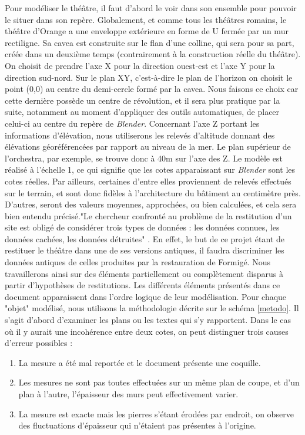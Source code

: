 Pour modéliser le théâtre, il faut d'abord le voir dans son ensemble pour pouvoir le situer dans son repère. Globalement, et comme tous les théâtres romains, le théâtre d'Orange a une enveloppe extérieure en forme de U fermée par un mur rectiligne. Sa \gls{cavea} est construite sur le flan d'une colline, qui sera pour sa part, créée dans un deuxième temps (contrairement à la construction réelle du théâtre). On choisit de prendre l'axe X pour la direction ouest-est et l'axe Y pour la direction sud-nord. Sur le plan XY, c'est-à-dire le plan de l'horizon on choisit le point (0,0) au centre du demi-cercle formé par la \gls{cavea}. Nous faisons ce choix car cette dernière possède un centre de révolution, et il sera plus pratique par la suite, notamment au moment d'appliquer des outils automatiques, de placer celui-ci au centre du repère de \textit{Blender}. Concernant l'axe Z portant les informations d'élévation, nous utiliserons les relevés d'altitude \cite[Pl. XXIX, XLIV, XLVIII, XLIX, LX]{orangePl} donnant des élévations géoréférencées par rapport au niveau de la mer. Le plan supérieur de l'\gls{orchestra}, par exemple, se trouve donc à 40m sur l'axe des Z. Le modèle est réalisé à l'échelle 1, ce qui signifie que les cotes apparaissant sur \textit{Blender} sont les cotes réelles. Par ailleurs, certaines d'entre elles proviennent de relevés effectués sur le terrain, et sont donc fidèles à l'architecture du bâtiment au centimètre près. D'autres, seront des valeurs moyennes, approchées, ou bien calculées, et cela sera bien entendu précisé."Le chercheur confronté au problème de la restitution d’un site est obligé de considérer trois types de données : les données connues, les données cachées, les données détruites" \cite[p. 27]{golvin}. En effet, le but de ce projet étant de restituer le théâtre dans une de ses versions antiques, il faudra discriminer les données antiques de celles produites par la restauration de Formigé. Nous travaillerons ainsi sur des éléments partiellement ou complètement disparus à partir d'hypothèses de restitutions. Les différents éléments présentés dans ce document apparaissent dans l'ordre logique de leur modélisation. Pour chaque "objet" modélisé, nous utilisons la méthodologie décrite sur le schéma \ref{metodo}. Il s'agit d'abord d'examiner les plans ou les textes qui s'y rapportent. Dans le cas où il y aurait une incohérence entre deux cotes, on peut distinguer trois causes d'erreur possibles :
\begin{enumerate}
	\item La mesure a été mal reportée et le document présente une coquille.
	\item Les mesures ne sont pas toutes effectuées sur un même plan de coupe, et d'un plan à l'autre, l'épaisseur des murs peut effectivement varier.
	\item La mesure est exacte mais les pierres s'étant érodées par endroit, on observe des fluctuations d'épaisseur qui n'étaient pas présentes à l'origine.
\end{enumerate}
